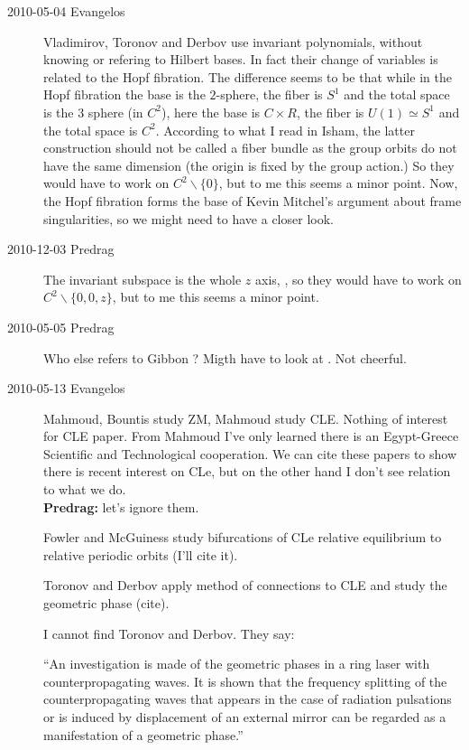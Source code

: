 \begin{description}
\item[2010-05-04 Evangelos] Vladimirov, Toronov and
Derbov use invariant polynomials, without knowing or
refering to Hilbert bases. In fact their change of variables is related
to the Hopf fibration. The difference seems to be that while in the Hopf
fibration the base is the $2$-sphere, the fiber is $S^1$ and the total
space is the $3$ sphere (in $C^2$), here the base is $C\times R$, the
fiber is $U(1)\simeq S^1$ and the total space is $C^2$. According to what
I read in Isham, the latter construction should not be called
a fiber bundle as the group orbits do not have the same dimension (the
origin is fixed by the group action.) So they would have to work on
$C^2\backslash \{0\}$, but to me this seems a minor point. Now, the Hopf
fibration forms the base of Kevin Mitchel's argument about frame
singularities, so we might need to have a closer look.

\item[2010-12-03  Predrag] The invariant subspace is the whole $z$ axis,
\ie, so they would have to work on $C^2\backslash \{0,0,z\}$, but to me
this seems a minor point.


\item[2010-05-05  Predrag]
Who else refers to Gibbon
\etal{}?
Migth have to look at
.
Not cheerful.

\item[2010-05-13  Evangelos]

Mahmoud, Bountis \etal{} study ZM, Mahmoud
\etal{} study CLE. Nothing of interest for CLE paper. From
Mahmoud \etal{} I've only learned there is an Egypt-Greece
Scientific and Technological cooperation. We can cite these papers to
show there is recent interest on CLe, but on the other hand I don't see
relation to what we do.
\\
{\bf Predrag:} let's ignore them.

Fowler and McGuiness study bifurcations of CLe relative equilibrium
to relative periodic orbits (I'll cite it).

Toronov and Derbov apply method of connections to CLE and
study the geometric phase (cite).

I cannot find Toronov and Derbov. They say:

``An investigation is made of the geometric phases in a ring laser with
   counterpropagating waves. It is shown that the frequency splitting of
   the counterpropagating waves that appears in the case of radiation
   pulsations or is induced by displacement of an external mirror can be
   regarded as a manifestation of a geometric phase.''


\end{description}
